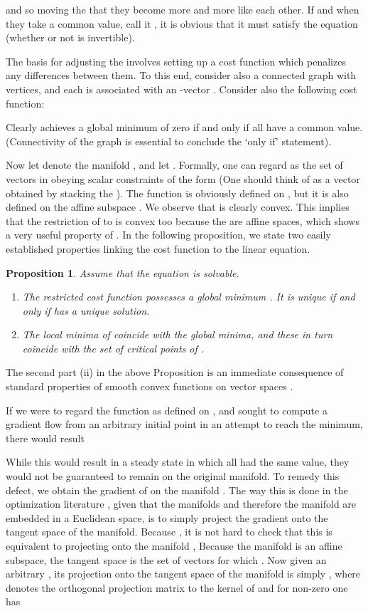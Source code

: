 \documentclass{aims}
\newtheorem{prop}{\textbf{Proposition}}
\begin{document}
and so moving the  that they become more and more like each other. If and when they take a common value,  call it , it is obvious that it must satisfy the equation  (whether or not  is invertible).

The basis for adjusting the  involves setting up a cost function which penalizes any differences between them. To this end, consider also a connected graph  with  vertices, and each is associated with an -vector .  Consider also the following cost function:


Clearly  achieves a global minimum of zero if and only if all  have a common value. (Connectivity of the graph is essential to conclude the `only if' statement).

Now let  denote the manifold , and
let . Formally, one can regard 
as the set of vectors  in   obeying  scalar constraints of the form
 (One should think of  as a vector obtained by stacking the ).
The function  is obviously defined on , but it is
also defined on the affine subspace . We observe that  is clearly
  convex. This implies that the restriction  of 
  to   is convex too because the  are affine spaces, which shows a very useful property
  of . In the following proposition, we state two easily established properties linking the cost function to the linear equation.

\begin{prop} Assume that the equation  is
  solvable. \begin{enumerate}
\item[(i)] The restricted cost function  possesses a global minimum . It is
  unique if and only if  has a unique solution.
\item[(ii)] The local
  minima of  coincide with the global minima, and
  these in turn coincide with the set of critical points of
  .
\end{enumerate}
\end{prop}

The second part (ii) in the above Proposition is an immediate consequence of standard properties of smooth
convex functions on vector spaces .





If we were to regard the function  as defined on
 , and sought to compute a gradient flow from an arbitrary initial point in an attempt to reach the minimum, there would result

While this would result in a steady state in which all  had the
same value, they would not be guaranteed to remain on the original
manifold. To remedy this defect, we obtain the gradient of  on the
manifold . The way this is done in the
  optimization literature \cite{UJ94Book,David69}, given that the manifolds
 and therefore the manifold  are embedded in
a Euclidean space, is to simply project the gradient onto the tangent
space of the manifold. Because  , it is not hard to check that this is equivalent to projecting  onto the manifold , Because the manifold  is an affine subspace, the tangent space is the set of vectors  for which .  Now given an arbitrary , its projection onto the tangent space of the manifold  is simply , where  denotes the orthogonal projection matrix to the kernel of  and for non-zero  one has
\end{document}
